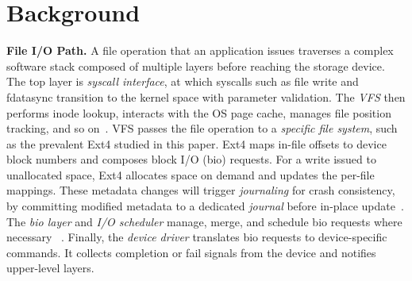 \section{Background}\label{sec:background}

\textbf{File I/O Path.}
A file operation that an application issues %
traverses a complex software stack composed of multiple layers 
before reaching the storage device.
The top  layer is  {\em syscall interface}, at which syscalls such as file write and fdatasync 
transition to the kernel space with parameter validation.
The {\em VFS} then performs inode lookup, interacts with the OS page cache, 
manages file position tracking, and so on~\cite{love2010linux}.
VFS passes the file operation to
a {\em specific file system}, such as the prevalent Ext4 studied in this paper.
Ext4
maps   in-file offsets to device block numbers and   composes block I/O (bio) requests.
For a write issued to unallocated space, Ext4 allocates   space on demand
and updates the per-file mappings. These metadata changes will trigger
{\em journaling} for crash consistency, by committing modified metadata
to a dedicated {\em journal}
before in-place update~\cite{mathur2007ext4,fsync:FastCommit:ATC-2024,fsync:iJournaling:ATC-2017}.
The {\em bio layer} and {\em I/O scheduler}  manage, merge, and schedule bio requests where necessary%
~\cite{love2010linux}.
Finally, the {\em device driver} translates bio requests to device-specific commands. It collects completion or fail signals from the device and
notifies upper-level  layers.

